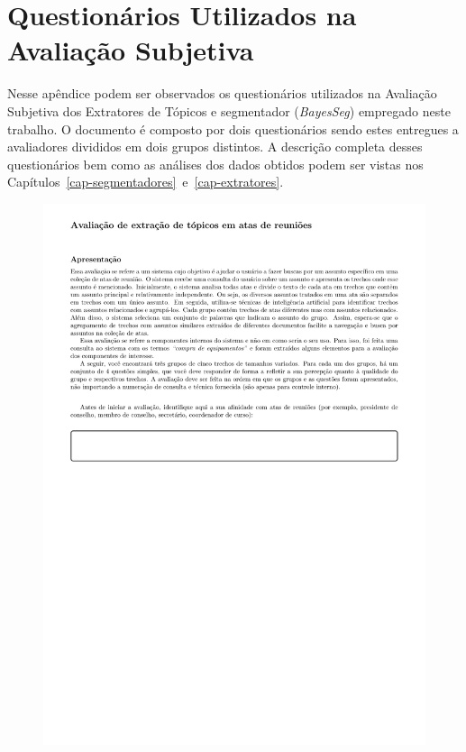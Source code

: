 \chapter{ Questionários Utilizados na Avaliação Subjetiva}\label{apendice2}





Nesse apêndice podem ser observados os questionários utilizados na Avaliação Subjetiva dos Extratores de Tópicos e segmentador (\textit{BayesSeg}) empregado neste trabalho. 
O documento é composto por dois questionários sendo estes entregues a avaliadores divididos em dois grupos distintos.
A descrição completa desses questionários bem como as análises dos dados obtidos podem ser vistas nos Capítulos~\ref{cap-segmentadores}~e~\ref{cap-extratores}.


\begin{figure}[h!]
\center
	\includegraphics[trim={ 40 0 0 0 }, trim={ 0 60 0 66 }, page=1,width=1.1\textwidth]{anexos/avaliacao-sistema/avaliacao-sistema.pdf}
\end{figure}


